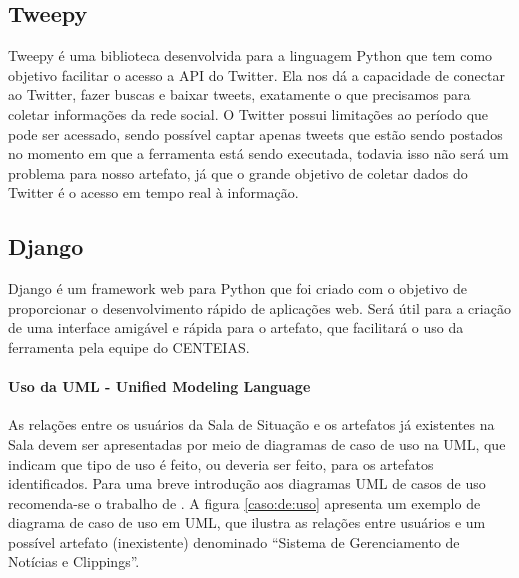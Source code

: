 \documentclass[12pt]{article}
\newcommand{\rascbegin}{\color{red}}    %
\begin{document}
	
	\subsection{Tweepy}
	Tweepy é uma biblioteca desenvolvida para a linguagem Python que tem como objetivo facilitar o acesso a API do Twitter. Ela nos dá a capacidade de conectar ao Twitter, fazer buscas e baixar tweets, exatamente o que precisamos para coletar informações da rede social. O Twitter possui limitações ao período que pode ser acessado, sendo possível captar apenas tweets que estão sendo postados no momento em que a ferramenta está sendo executada, todavia isso não será um problema para nosso artefato, já que o grande objetivo de coletar dados do Twitter é o acesso em tempo real à informação.
	
	\subsection{Django}
	Django é um framework web para Python que foi criado com o objetivo de proporcionar o desenvolvimento rápido de aplicações web. Será útil para a criação de uma interface amigável e rápida para o artefato, que facilitará o uso da ferramenta pela equipe do CENTEIAS.
	
	\rascbegin
	
	
	\paragraph{Uso da UML - Unified Modeling Language} As relações entre os usuários da Sala de Situação e os artefatos já existentes na Sala devem ser apresentadas por meio de diagramas de caso de uso na UML, que indicam que tipo de uso é feito, ou deveria ser feito, para os artefatos identificados.
	Para uma breve introdução aos diagramas UML de casos de uso recomenda-se o trabalho de \citet{lucidchart_modelos_2019}. A figura \ref{caso:de:uso} apresenta um exemplo de diagrama de caso de uso em UML, que ilustra as relações entre usuários e um possível artefato (inexistente) denominado ``Sistema de Gerenciamento de Notícias e Clippings''.
	
\end{document}
